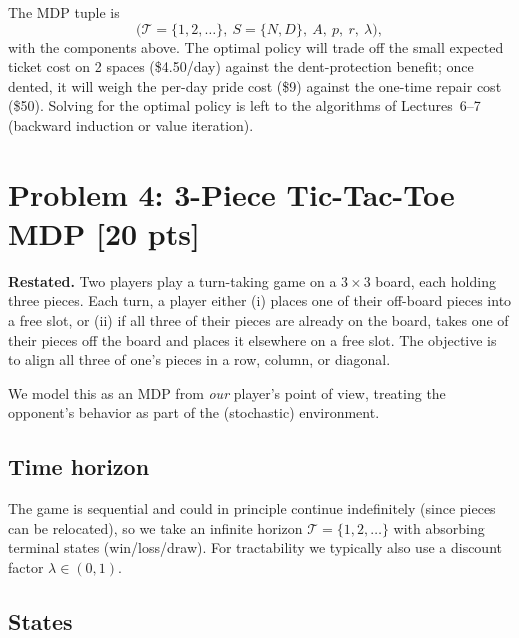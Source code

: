 \documentclass[12pt]{article}
\begin{document}
The MDP tuple is
\[
  \big(\mathcal{T} = \{1, 2, \ldots\},\ S = \{N, D\},\ A,\ p,\ r,\ \lambda\big),
\]
with the components above. The optimal policy will trade off the small expected ticket cost on 2 spaces (\$4.50/day) against the dent-protection benefit; once dented, it will weigh the per-day pride cost (\$9) against the one-time repair cost (\$50). Solving for the optimal policy is left to the algorithms of Lectures~6--7 (backward induction or value iteration).

\section*{Problem 4: 3-Piece Tic-Tac-Toe MDP \hfill [20 pts]}

\textbf{Restated.} Two players play a turn-taking game on a $3 \times 3$ board, each holding three pieces. Each turn, a player either (i) places one of their off-board pieces into a free slot, or (ii) if all three of their pieces are already on the board, takes one of their pieces off the board and places it elsewhere on a free slot. The objective is to align all three of one's pieces in a row, column, or diagonal.

We model this as an MDP from \emph{our} player's point of view, treating the opponent's behavior as part of the (stochastic) environment.

\subsection*{Time horizon}

The game is sequential and could in principle continue indefinitely (since pieces can be relocated), so we take an infinite horizon $\mathcal{T} = \{1, 2, \ldots\}$ with absorbing terminal states (win/loss/draw). For tractability we typically also use a discount factor $\lambda \in (0, 1)$.

\subsection*{States}
\end{document}
